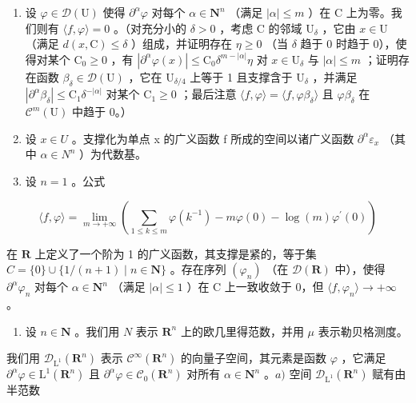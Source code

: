 \begin{enumerate}
\def\labelenumi{\alph{enumi})}
\setcounter{enumi}{1}
\item
  设 \(\varphi \in \mathcal{D}(\mathrm{U})\) 使得 \(\partial^{\alpha}\varphi\) 对每个 \(\alpha \in \mathbf{N}^{n}\) （满足 \(|\alpha| \leqslant m\) ）在 C 上为零。我们则有 \(\langle f, \varphi \rangle = 0\) 。（对充分小的 \(\delta > 0\) ，考虑 C 的邻域 \(\mathrm{U}_{\delta}\) ，它由 \(x \in \mathrm{U}\) （满足 \(d(x, \mathrm{C}) \leqslant \delta\) ）组成，并证明存在 \(\eta \geqslant 0\) （当 \(\delta\) 趋于 0 时趋于 0），使得对某个 \(\mathrm{C}_{0} \geqslant 0\) ，有 \(|\partial^{\alpha}\varphi(x)| \leqslant \mathrm{C}_{0}\delta^{m-|\alpha|}\eta\) 对 \(x \in \mathrm{U}_{\delta}\) 与 \(|\alpha| \leqslant m\) ；证明存在函数 \(\beta_{\delta} \in \mathcal{D}(\mathrm{U})\) ，它在 \(\mathrm{U}_{\delta/4}\) 上等于 1 且支撑含于 \(\mathrm{U}_{\delta}\) ，并满足 \(|\partial^{\alpha}\beta_{\delta}| \leqslant \mathrm{C}_{1}\delta^{-|\alpha|}\) 对某个 \(\mathrm{C}_{1} \geqslant 0\) ；最后注意 \(\langle f, \varphi \rangle = \langle f, \varphi\beta_{\delta} \rangle\) 且 \(\varphi\beta_{\delta}\) 在 \(\mathcal{C}^{m}(\mathrm{U})\) 中趋于 0。）
\item
  设 \(x \in U\) 。支撑化为单点 x 的广义函数 f 所成的空间以诸广义函数 \(\partial^{\alpha}\varepsilon_{x}\) （其中 \(\alpha \in N^{n}\) ）为代数基。
\item
  设 \(n = 1\) 。公式
\end{enumerate}

\[
\langle f, \varphi \rangle = \lim _ {m \rightarrow + \infty} \left(\sum_ {1 \leqslant k \leqslant m} \varphi (k ^ {- 1}) - m \varphi (0) - \log (m) \varphi^ {\prime} (0)\right)
\]

在 \(\mathbf{R}\) 上定义了一个阶为 1 的广义函数，其支撑是紧的，等于集 \(C = \{0\} \cup \{1/(n+1) \mid n \in \mathbf{N}\}\) 。存在序列 \((\varphi_n)\) （在 \(\mathcal{D}(\mathbf{R})\) 中），使得 \(\partial^{\alpha}\varphi_{n}\) 对每个 \(\alpha\in\mathbf{N}^{n}\) （满足 \(|\alpha|\leqslant1\) ）在 C 上一致收敛于 0，但 \(\langle f,\varphi_{n}\rangle\to+\infty\) 。

\begin{enumerate}
\def\labelenumi{\arabic{enumi})}
\setcounter{enumi}{24}
\tightlist
\item
  设 \(n \in \mathbf{N}\) 。我们用 \(N\) 表示 \(\mathbf{R}^n\) 上的欧几里得范数，并用 \(\mu\) 表示勒贝格测度。
\end{enumerate}

我们用 \(\mathcal{D}_{\mathrm{L}^{1}}(\mathbf{R}^{n})\) 表示 \(\mathcal{C}^{\infty}(\mathbf{R}^{n})\) 的向量子空间，其元素是函数 \(\varphi\) ，它满足 \(\partial^{\alpha}\varphi\in\mathrm{L}^{1}(\mathbf{R}^{n})\) 且 \(\partial^{\alpha}\varphi\in\mathcal{C}_{0}(\mathbf{R}^{n})\) 对所有 \(\alpha\in\mathbf{N}^{n}\) 。\(a)\) 空间 \(\mathcal{D}_{\mathrm{L}^{1}}(\mathbf{R}^{n})\) 赋有由半范数

